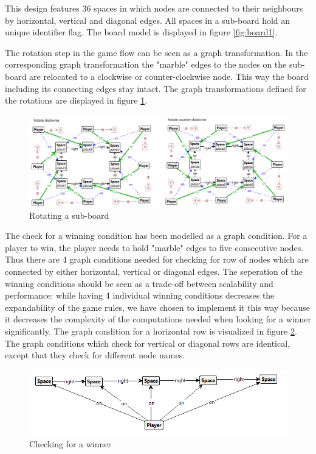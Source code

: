 This design features 36 spaces in which nodes are connected to their neighbours by horizontal, vertical and diagonal edges.
All spaces in a sub-board hold an unique identifier flag.
The board model is displayed in figure \ref{fig:board1}.

\vspace{6pt}

The rotation step in the game flow can be seen as a graph transformation.
In the corresponding graph transformation the "marble" edges to the nodes on the sub-board are relocated to a clockwise or counter-clockwise node.
This way the board including its connecting edges stay intact.
The graph transformations defined for the rotations are displayed in figure \ref{fig:rotate1}.

\begin{figure}[!h]
    \centering
    \includegraphics[scale=0.5,clip]{Images/rotate1.png}
    \caption{Rotating a sub-board}
    \label{fig:rotate1}
\end{figure}

\vspace{6pt}

The check for a winning condition has been modelled as a graph condition.
For a player to win, the player needs to hold "marble" edges to five consecutive nodes.
Thus there are 4 graph conditions needed for checking for row of nodes which are connected by either horizontal, vertical or diagonal edges.
The seperation of the winning conditions should be seen as a trade-off between scalability and performance: while having 4 individual winning conditions decreases the expandability of the game rules, we have chosen to implement it this way because it decreases the complexity of the computations needed when looking for a winner significantly.
The graph condition for a horizontal row is visualized in figure \ref{fig:endgame1}.
The graph conditions which check for vertical or diagonal rows are identical, except that they check for different node names.

\begin{figure}[!h]
    \centering
    \includegraphics[scale=0.5,clip]{Images/endgame1.png}
    \caption{Checking for a winner}
    \label{fig:endgame1}
\end{figure}

